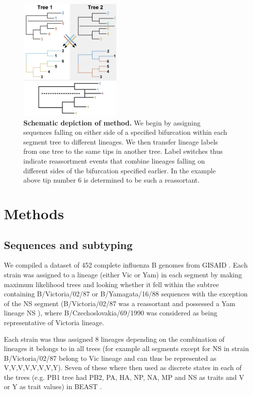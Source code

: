 \documentclass[11pt,oneside,letterpaper]{article}
\begin{document}
\begin{figure}[h]
 \centering		
	\includegraphics[width=0.45\textwidth]{figures/TreeFigure2}
	\caption{\textbf{Schematic depiction of method.}
We begin by assigning sequences falling on either side of a specified bifurcation within each segment tree to different lineages.
We then transfer lineage labels from one tree to the same tips in another tree.
Label switches thus indicate reassortment events that combine lineages falling on different sides of the bifurcation specified earlier.
In the example above tip number 6 is determined to be such a reassortant.}
	\label{methodFig}
\end{figure}

\section*{Methods}

\subsection*{Sequences and subtyping}
We compiled a dataset of 452 complete influenza B genomes from GISAID \cite{GISAID}. 
Each strain was assigned to a lineage (either Vic or Yam) in each segment by making maximum likelihood trees and looking whether it fell within the subtree containing B/Victoria/02/87 or B/Yamagata/16/88 sequences with the exception of the NS segment (B/Victoria/02/87 was a reassortant and possessed a Yam lineage NS \cite{lindstrom1999}), where B/Czechoslovakia/69/1990 was considered as being representative of Victoria lineage.

Each strain was thus assigned 8 lineages depending on the combination of lineages it belongs to in all trees (for example all segments except for NS in strain B/Victoria/02/87 belong to Vic lineage and can thus be represented as V,V,V,V,V,V,V,Y). 
Seven of these where then used as discrete states in each of the trees (e.g. PB1 tree had PB2, PA, HA, NP, NA, MP and NS as traits and V or Y as trait values) in BEAST \cite{drummond2012}.
\end{document}
